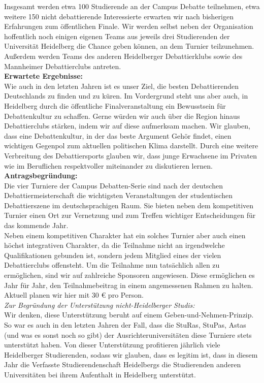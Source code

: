 {    Insgesamt werden etwa 100 Studierende an der Campus Debatte teilnehmen, etwa weitere 150 nicht debattierende Interessierte erwarten wir nach bisherigen Erfahrungen zum öffentlichen Finale. Wir werden selbst neben der Organisation hoffentlich noch einigen eigenen Teams aus jeweils drei Studierenden der Universität Heidelberg die Chance geben können, an dem Turnier teilzunehmen.\\
    Außerdem werden Teams des anderen Heidelberger Debattierklubs sowie des Mannheimer Debattierclubs antreten.\\[1em]
    \textbf{Erwartete Ergebnisse:}\\
    Wie auch in den letzten Jahren ist es unser Ziel, die besten Debattierenden Deutschlands zu finden und zu küren. Im Vordergrund steht uns aber auch, in Heidelberg durch die öffentliche Finalveranstaltung ein Bewusstsein für Debattenkultur zu schaffen. Gerne würden wir auch über die Region hinaus Debattierclubs stärken, indem wir auf diese aufmerksam machen. Wir glauben, dass eine Debattenkultur, in der das beste Argument Gehör findet, einen wichtigen Gegenpol zum aktuellen politischen Klima darstellt. Durch eine weitere Verbreitung des Debattiersports glauben wir, dass junge Erwachsene im Privaten wie im Beruflichen respektvoller miteinander zu diskutieren lernen.\\[1em]
    \textbf{Antragsbegründung:}\\
    Die vier Turniere der Campus Debatten-Serie sind nach der deutschen Debattiermeisterschaft die wichtigsten Veranstaltungen der studentischen Debattierszene im deutschsprachigen Raum. Sie bieten neben dem kompetitiven Turnier einen Ort zur Vernetzung und zum Treffen wichtiger Entscheidungen für das kommende Jahr.\\
    Neben einem kompetitiven Charakter hat ein solches Turnier aber auch einen höchst integrativen Charakter, da die Teilnahme nicht an irgendwelche Qualifikationen gebunden ist, sondern jedem Mitglied eines der vielen Debattierclubs offensteht. Um die Teilnahme nun tatsächlich allen zu ermöglichen, sind wir auf zahlreiche Sponsoren angewiesen. Diese ermöglichen es Jahr für Jahr, den Teilnahmebeitrag in einem angemessenen Rahmen zu halten. Aktuell planen wir hier mit 30 € pro Person.\\[1em]
    \emph{Zur Begründung der Unterstützung nicht-Heidelberger Studis:}\\
    Wir denken, diese Unterstützung beruht auf einem Geben-und-Nehmen-Prinzip. So war es auch in den letzten Jahren der Fall, dass die StuRas, StuPas, Astas (und was es sonst noch so gibt) der Ausrichteruniversitäten diese Turniere stets unterstützt haben. Von dieser Unterstützung profitieren jährlich viele Heidelberger Studierenden, sodass wir glauben, dass es legitim ist, dass in diesem Jahr die Verfasste Studierendenschaft Heidelbergs die Studierenden anderen Universitäten bei ihrem Aufenthalt in Heidelberg unterstützt.\\[1em]
}

